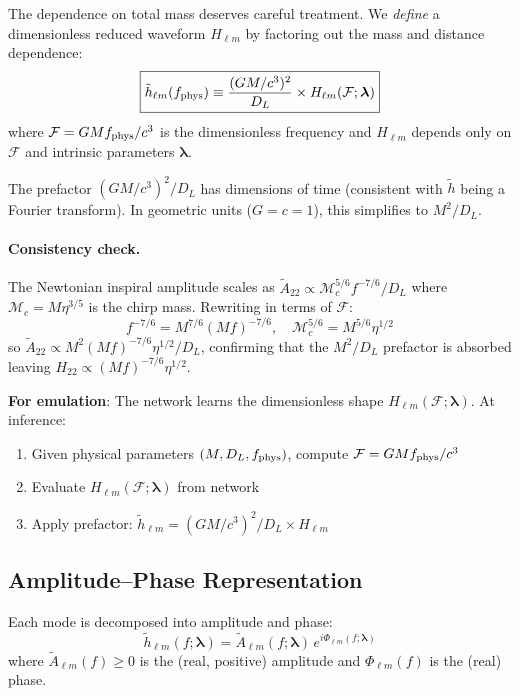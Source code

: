 \documentclass[11pt,a4paper]{article}
\newcommand{\htlm}{\tilde{h}_{\ell m}}
\newcommand{\Atlm}{\tilde{A}_{\ell m}}
\newcommand{\Philm}{\Phi_{\ell m}}
\newcommand{\veclambda}{\bm{\lambda}}
\newcommand{\Mf}{\mathcal{F}}
\begin{document}
The dependence on total mass deserves careful treatment. We \emph{define} a dimensionless reduced waveform $H_{\ell m}$ by factoring out the mass and distance dependence:
\begin{equation}
    \boxed{
    \tilde{h}_{\ell m}(f_{\rm phys}) \equiv \frac{(G M / c^3)^2}{D_L} \times H_{\ell m}(\Mf; \veclambda)
    }
    \label{eq:mass_scaling}
\end{equation}
where $\Mf = G M f_{\rm phys} / c^3$ is the dimensionless frequency and $H_{\ell m}$ depends only on $\Mf$ and intrinsic parameters $\veclambda$.

The prefactor $(GM/c^3)^2 / D_L$ has dimensions of time (consistent with $\tilde{h}$ being a Fourier transform). In geometric units ($G = c = 1$), this simplifies to $M^2 / D_L$.

\paragraph{Consistency check.} The Newtonian inspiral amplitude scales as $\tilde{A}_{22} \propto \mathcal{M}_c^{5/6} f^{-7/6} / D_L$ where $\mathcal{M}_c = M \eta^{3/5}$ is the chirp mass. Rewriting in terms of $\Mf$:
\begin{equation}
    f^{-7/6} = M^{7/6} (Mf)^{-7/6}, \quad \mathcal{M}_c^{5/6} = M^{5/6} \eta^{1/2}
\end{equation}
so $\tilde{A}_{22} \propto M^2 (Mf)^{-7/6} \eta^{1/2} / D_L$, confirming that the $M^2/D_L$ prefactor is absorbed leaving $H_{22} \propto (Mf)^{-7/6} \eta^{1/2}$.

\textbf{For emulation}: The network learns the dimensionless shape $H_{\ell m}(\Mf; \veclambda)$. At inference:
\begin{enumerate}
    \item Given physical parameters $(M, D_L, f_{\rm phys})$, compute $\Mf = G M f_{\rm phys} / c^3$
    \item Evaluate $H_{\ell m}(\Mf; \veclambda)$ from network
    \item Apply prefactor: $\tilde{h}_{\ell m} = (G M / c^3)^2 / D_L \times H_{\ell m}$
\end{enumerate}

\subsection{Amplitude--Phase Representation}

Each mode is decomposed into amplitude and phase:
\begin{equation}
    \boxed{
    \htlm(f; \veclambda) = \Atlm(f; \veclambda) \, e^{i \Philm(f; \veclambda)}
    }
    \label{eq:amp_phase}
\end{equation}
where $\Atlm(f) \geq 0$ is the (real, positive) amplitude and $\Philm(f)$ is the (real) phase.
\end{document}
